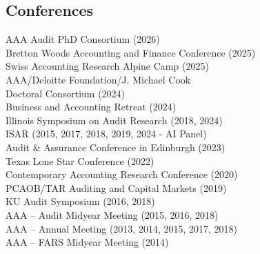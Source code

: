 \documentclass[]{deedy-resume-openfont}
\begin{document}
\begin{minipage}[t]{0.5\textwidth} 

\subsection{Conferences}
AAA Audit PhD Consortium (2026) \\
Bretton Woods Accounting and Finance Conference (2025) \\
Swiss Accounting Research Alpine Camp (2025) \\
AAA/Deloitte Foundation/J. Michael Cook \\
\hspace*{.4cm} Doctoral Consortium (2024) \\ 
Business and Accounting Retreat (2024) \\ 
Illinois Symposium on Audit Research (2018, 2024) \\
ISAR (2015, 2017, 2018, 2019, 2024 - AI Panel) \\
Audit \& Assurance Conference in Edinburgh (2023) \\
Texas Lone Star Conference (2022) \\
Contemporary Accounting Research Conference (2020) \\
PCAOB/TAR Auditing and Capital Markets (2019) \\
KU Audit Symposium (2016, 2018) \\
AAA – Audit Midyear Meeting (2015, 2016, 2018) \\
AAA – Annual Meeting (2013, 2014, 2015, 2017, 2018) \\
AAA – FARS Midyear Meeting (2014) 



\sectionsep

\end{minipage} 
\hfill
\end{document}
